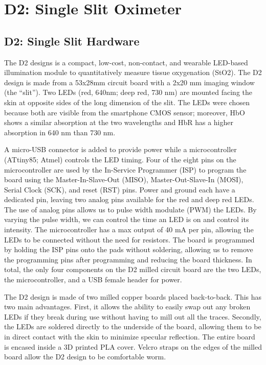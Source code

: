 \section{D2: Single Slit Oximeter}
    \subsection{D2: Single Slit Hardware}
    The D2 designs is a compact, low-cost, non-contact, and wearable LED-based illumination module to quantitatively measure tissue oxygenation (StO2). The D2 design is made from a 53x28mm circuit board with a 2x20 mm imaging window (the “slit”). Two LEDs (red, 640nm; deep red, 730 nm) are mounted facing the skin at opposite sides of the long dimension of the slit. The LEDs were chosen because both are visible from the smartphone CMOS sensor; moreover, HbO shows a similar absorption at the two wavelengths and HbR has a higher absorption in 640 nm than 730 nm. 
    
    A micro-USB connector is added to provide power while a microcontroller (ATtiny85; Atmel) controls the LED timing. Four of the eight pins on the microcontroller are used by the In-Service Programmer (ISP) to program the board using the Master-In-Slave-Out (MISO), Master-Out-Slave-In (MOSI), Serial Clock (SCK), and reset (RST) pins. Power and ground each have a dedicated pin, leaving two analog pins available for the red and deep red LEDs. The use of analog pins allows us to pulse width modulate (PWM) the LEDs. By varying the pulse width, we can control the time an LED is on and control its intensity. The microcontroller has a max output of 40 mA per pin, allowing the LEDs to be connected without the need for resistors. The board is programmed by holding the ISP pins onto the pads without soldering, allowing us to remove the programming pins after programming and reducing the board thickness. In total, the only four components on the D2 milled circuit board are the two LEDs, the microcontroller, and a USB female header for power. 

    The D2 design is made of two milled copper boards placed back-to-back. This has two main advantages. First, it allows the ability to easily swap out any broken LEDs if they break during use without having to mill out all the traces. Secondly, the LEDs are soldered directly to the underside of the board, allowing them to be in direct contact with the skin to minimize specular reflection. The entire board is encased inside a 3D printed PLA cover. Velcro straps on the edges of the milled board allow the D2 design to be comfortable worm. 

